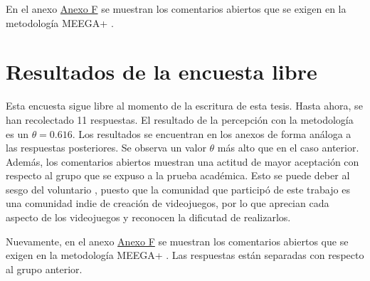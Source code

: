 En el anexo \hyperref[AnexoF]{Anexo F} se muestran los comentarios abiertos que se exigen en la metodología MEEGA+ \cite{meegaplus}.  

\section{Resultados de la encuesta libre}

Esta encuesta sigue libre al momento de la escritura de esta tesis. Hasta ahora, se han recolectado 11 respuestas. El resultado de la percepción con la metodología \cite{meegaplus} es un  $\theta = 0.616$. Los resultados se encuentran en los anexos de forma análoga a las respuestas posteriores. Se observa un valor $\theta$ más alto que en el caso anterior. Además, los comentarios abiertos muestran una actitud de mayor aceptación con respecto al grupo que se expuso a la prueba académica. Esto se puede deber al sesgo del voluntario \cite{volunterBias}, puesto que la comunidad que participó de este trabajo es una comunidad indie de creación de videojuegos, por lo que aprecian cada aspecto de los videojuegos y reconocen la dificutad de realizarlos.

Nuevamente, en el anexo \hyperref[AnexoF]{Anexo F} se muestran los comentarios abiertos que se exigen en la metodología MEEGA+ \cite{meegaplus}. Las respuestas están separadas con respecto al grupo anterior. 

